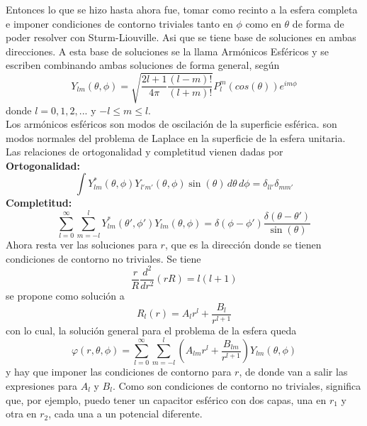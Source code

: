 Entonces lo que se hizo hasta ahora fue, tomar como recinto a la esfera completa e imponer condiciones de contorno triviales tanto en $\phi$ como en $\theta$ de forma de poder resolver con Sturm-Liouville. Asi que se tiene base de soluciones en ambas direcciones. A esta base de soluciones se la llama Armónicos Esféricos y se escriben combinando ambas soluciones de forma general, según
\begin{equation}
    Y_{lm}(\theta, \phi) =
    \sqrt%
    {
        \frac{2l + 1}{4\pi}
        \frac{(l-m)!}{(l+m)!}
    }
    P_{l}^{m}(cos{(\theta)})
    e^{im\phi}
        \label{ec:ArmonicosEsfericos}
\end{equation}
donde $l = 0,1,2,...$ y $-l \leq m \leq l$.\\
\indent Los armónicos esféricos son modos de oscilación de la superficie esférica. son modos normales del problema de Laplace en la superficie de la esfera unitaria.\\
\indent Las relaciones de ortogonalidad y completitud vienen dadas por\\
\textbf{Ortogonalidad:}
\begin{equation*}
    \int Y_{lm}^{*}(\theta,\phi)
    Y_{l'm'}(\theta,\phi)
    \sin{(\theta)}\,d\theta\,d\phi = 
    \delta_{ll'}\delta_{mm'}
\end{equation*}
\textbf{Completitud:}
\begin{equation*}
    \sum\limits_{l = 0}^{\infty}
    \sum\limits_{m = -l}^{l}
    Y_{lm}^{*}(\theta',\phi')
    Y_{lm}(\theta, \phi)
    = \delta(\phi - \phi')\frac{\delta(\theta - \theta')}{\sin{(\theta)}}
\end{equation*}
Ahora resta ver las soluciones para $r$, que es la dirección donde se tienen condiciones de contorno no triviales. Se tiene
\begin{equation*}
    \frac{r}{R}\frac{d^{2}}{dr^{2}}(rR) = l(l+1)
\end{equation*}
se propone como solución a 
\begin{equation*}
    R_{l}(r) = A_{l}r^{l} + \frac{B_{l}}{r^{l+1}}
\end{equation*}
con lo cual, la solución general para el problema de la esfera queda
\begin{equation*}
    \varphi(r,\theta,\phi) = 
    \sum\limits_{l = 0}^{\infty}
    \sum\limits_{m = -l}^{l}
    \left(
        A_{lm}r^{l} + \frac{B_{lm}}{r^{l+1}}
    \right)Y_{lm}(\theta,\phi)
\end{equation*}
y hay que imponer las condiciones de contorno para $r$, de donde van a salir las expresiones para $A_{l}$ y $B_{l}$. Como son condiciones de contorno no triviales, significa que, por ejemplo, puedo tener un capacitor esférico con dos capas, una en $r_{1}$ y otra en $r_{2}$, cada una a un potencial diferente.\\
